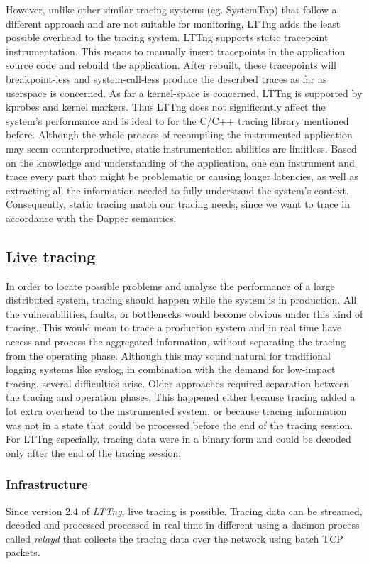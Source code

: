 \documentclass[a4paper,10pt,twocolumn]{article}
\begin{document}
However, unlike other similar tracing systems (eg. SystemTap\cite{systemtap})
that follow a different approach and are not suitable for monitoring, LTTng adds
the least possible overhead to the tracing system. LTTng supports static
tracepoint instrumentation. This means to manually insert tracepoints in the
application source code and rebuild the application. After rebuilt, these
tracepoints will breakpoint-less and system-call-less produce the described
traces as far as userspace is concerned. As far a kernel-space is concerned,
LTTng is supported by kprobes and kernel markers. Thus LTTng does not
significantly affect the system's performance and is ideal to for the C/C++
tracing library mentioned before.  Although the whole process of recompiling the
instrumented application  may seem counterproductive, static instrumentation
abilities are limitless. Based on the knowledge and understanding of the
application, one can instrument and trace every part that might be problematic
or causing longer latencies, as well as extracting all the information needed to
fully understand the system's context.  Consequently, static tracing match our
tracing needs, since we want to trace in accordance with the Dapper semantics.

\subsection{Live tracing} In order to locate possible problems and analyze the
performance of a large distributed system, tracing should happen while the
system is in production.  All the vulnerabilities, faults, or bottlenecks would
become obvious under this kind of tracing. This would mean to trace a production
system and in real time have access and process the aggregated information,
without separating the tracing from the operating phase. Although this may sound
natural for traditional logging systems like syslog, in combination with the
demand for low-impact tracing, several difficulties arise. Older approaches
required separation between the tracing and operation phases. This happened
either because tracing added a lot extra overhead to the instrumented system, or
because tracing information was not in a state that could be processed before
the end of the tracing session. For LTTng especially, tracing data were in a
binary form and could be decoded only after the end of the tracing session. 

\subsubsection{Infrastructure} Since version 2.4 of \emph{LTTng}, live tracing
is possible. Tracing data can be streamed, decoded and processed processed in
real time in different using a daemon process called \emph{relayd} that collects
the tracing data over the network using batch TCP packets.  
\end{document}
